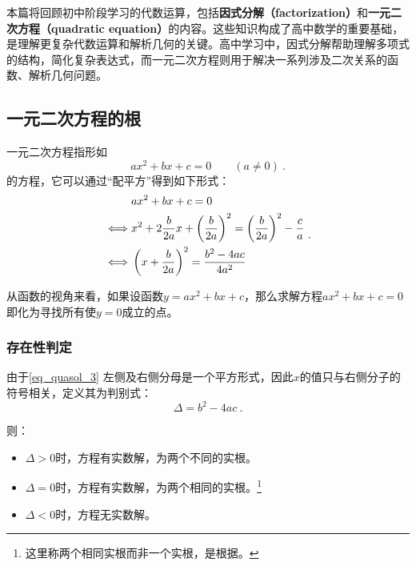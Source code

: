 
本篇将回顾初中阶段学习的代数运算，包括\textbf{因式分解（factorization）}和\textbf{一元二次方程（quadratic equation）}的内容。这些知识构成了高中数学的重要基础，是理解更复杂代数运算和解析几何的关键。高中学习中，因式分解帮助理解多项式的结构，简化复杂表达式，而一元二次方程则用于解决一系列涉及二次关系的函数、解析几何问题。

\subsection{一元二次方程的根}

一元二次方程指形如
\begin{equation}
ax^2+bx+c=0 \qquad (a\neq 0)~.
\end{equation}
的方程，它可以通过“配平方”得到如下形式：
\begin{equation}\label{eq_quasol_3}
\begin{split}
 & ax^2+bx+c = 0 \\ 
\iff&x^2+2{b\over 2a} x+\left({b\over 2a}\right)^2 = \left({b\over 2a}\right)^2-{c\over a} \\ 
\iff&\left(x+{b\over 2a}\right)^2 = {b^2-4ac\over 4a^2} \\ 
\end{split}~.
\end{equation}

从函数的视角来看，如果设函数$y=ax^2+bx+c$，那么求解方程$ax^2+bx+c=0$即化为寻找所有使$y=0$成立的点。

\subsubsection{存在性判定}

由于\autoref{eq_quasol_3} 左侧及右侧分母是一个平方形式，因此$x$的值只与右侧分子的符号相关，定义其为判别式：
\begin{equation}
\Delta = b^2-4ac~.
\end{equation}

则：
\begin{itemize}
\item $\Delta > 0$时，方程有实数解，为两个不同的实根。
\item $\Delta = 0$时，方程有实数解，为两个相同的实根。\footnote{这里称两个相同实根而非一个实根，是根据。}
\item $\Delta < 0$时，方程无实数解。
\end{itemize}

